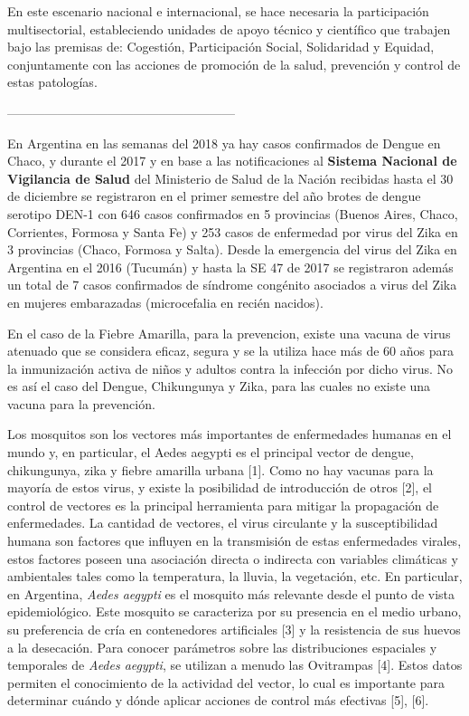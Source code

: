 En  este  escenario  nacional  e  internacional,  se  hace  necesaria  la  participación  multisectorial,
estableciendo unidades  de  apoyo  técnico  y  científico  que  trabajen  bajo
las  premisas de:  Cogestión, Participación Social, Solidaridad y Equidad, conjuntamente con las
acciones de promoción de la salud, prevención y control de estas patologías.


------------------------------------------------------

En Argentina en las semanas del 2018 ya hay casos confirmados de Dengue en Chaco,
y durante el 2017 y en base a las notificaciones al
\textbf{Sistema Nacional de Vigilancia de Salud} del Ministerio de Salud de la Nación
recibidas hasta el 30 de diciembre se registraron en el primer semestre del año brotes de
dengue serotipo DEN-1 con 646 casos confirmados en 5 provincias
(Buenos Aires, Chaco, Corrientes, Formosa y Santa Fe) y 253 casos de enfermedad
por virus del Zika en 3 provincias (Chaco, Formosa y Salta).
Desde la emergencia del virus del Zika en Argentina en el 2016 (Tucumán) y hasta
la SE 47 de 2017 se registraron además un total de 7 casos confirmados de
síndrome congénito asociados a virus del Zika en mujeres embarazadas (microcefalia en recién nacidos).

\par En el caso de la Fiebre Amarilla, para la prevencion, existe una vacuna de
virus atenuado que se considera eficaz, segura y se la utiliza hace más
de 60 años para la inmunización activa de niños y adultos contra la infección
por dicho virus. No es así el caso del Dengue, Chikungunya y Zika, para las
cuales no existe una vacuna para la prevención.


Los mosquitos son los vectores más importantes de enfermedades humanas en el
mundo y, en particular, el Aedes aegypti es el principal vector de dengue,
chikungunya, zika y fiebre amarilla urbana [1]. Como no hay vacunas para la
mayoría de estos virus, y existe la posibilidad de introducción de otros [2],
el control de vectores es la principal herramienta para mitigar la
propagación de enfermedades. La cantidad de vectores, el virus circulante y la
susceptibilidad humana son factores que influyen en la transmisión de estas
enfermedades virales, estos factores poseen una asociación directa o indirecta
con variables climáticas y ambientales tales como la temperatura, la lluvia,
la vegetación, etc. En particular, en Argentina, \textit{Aedes aegypti} es el
mosquito más relevante desde el punto de vista epidemiológico.
Este mosquito se caracteriza por su presencia en el medio urbano, su preferencia
de cría en contenedores artificiales [3] y la resistencia de sus huevos a la
desecación. Para conocer parámetros sobre las distribuciones espaciales y temporales
de \textit{Aedes aegypti}, se utilizan a menudo las Ovitrampas [4].
Estos datos permiten el conocimiento de la actividad del vector, lo cual es importante para determinar cuándo y
dónde aplicar acciones de control más efectivas [5], [6].





